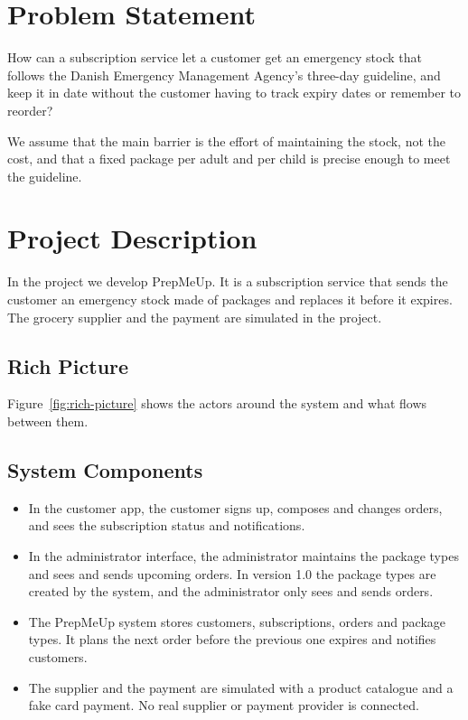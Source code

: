\documentclass[a4paper,11pt]{article}
\begin{document}
\section*{Problem Statement}
How can a subscription service let a customer get an emergency stock that follows the
Danish Emergency Management Agency's three-day guideline, and keep it in date without
the customer having to track expiry dates or remember to reorder?

We assume that the main barrier is the effort of maintaining the stock, not the cost, and
that a fixed package per adult and per child is precise enough to meet the guideline.

\section*{Project Description}
In the project we develop PrepMeUp. It is a subscription service that sends the customer
an emergency stock made of packages and replaces it before it expires. The grocery
supplier and the payment are simulated in the project.

\subsection*{Rich Picture}
Figure~\ref{fig:rich-picture} shows the actors around the system and what flows between them.

\subsection*{System Components}
\begin{itemize}[nosep]
  \item In the customer app, the customer signs up, composes and changes orders, and sees the subscription status and notifications.
  \item In the administrator interface, the administrator maintains the package types and sees and sends upcoming orders. In version 1.0 the package types are created by the system, and the administrator only sees and sends orders.
  \item The PrepMeUp system stores customers, subscriptions, orders and package types. It plans the next order before the previous one expires and notifies customers.
  \item The supplier and the payment are simulated with a product catalogue and a fake card payment. No real supplier or payment provider is connected.
\end{itemize}
\end{document}

